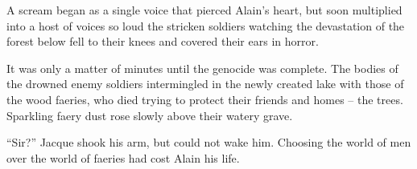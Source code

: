 A scream began as a single voice that pierced Alain's heart, but soon
multiplied into a host of voices so loud the stricken soldiers watching
the devastation of the forest below fell to their knees and covered
their ears in horror.

It was only a matter of minutes until the genocide was complete. The
bodies of the drowned enemy soldiers intermingled in the newly created
lake with those of the wood faeries, who died trying to protect their
friends and homes -- the trees. Sparkling faery dust rose slowly above
their watery grave.

``Sir?'' Jacque shook his arm, but could not wake him. Choosing the
world of men over the world of faeries had cost Alain his life.
